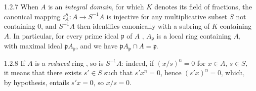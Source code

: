 \begin{env}{1.2.7}
\label{env-0.1.2.7}
When $A$ is an \emph{integral domain}, for which $K$ denotes its field of fractions, the canonical mapping $i_A^S\colon A\to S^{-1}A$
is injective for any multiplicative subset $S$ not containing $0$, and $S^{-1}A$ then identifies canonically with a subring of $K$
containing $A$. In particular, for every prime ideal $\mathfrak{p}$ of $A$ , $A_\mathfrak{p}$ is a local ring containing $A$,
with maximal ideal $\mathfrak{p}A_\mathfrak{p}$, and we have $\mathfrak{p}A_\mathfrak{p}\cap A=\mathfrak{p}$.
\end{env}

\begin{env}{1.2.8}
\label{env-0.1.2.8}
If $A$ is a \emph{reduced} ring , so is $S^{-1}A$: indeed, if $(x/s)^n=0$ for $x\in A$, $s\in S$, it means that
there exists $s'\in S$ such that $s'x^n=0$, hence $(s'x)^n=0$, which, by hypothesis, entails $s'x=0$, so $x/s=0$.
\end{env}

